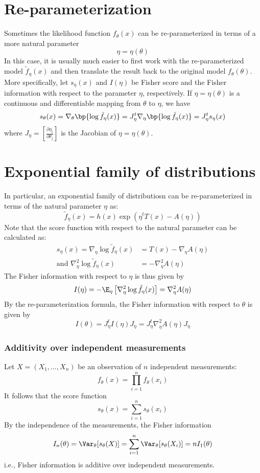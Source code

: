 \section{Re-parameterization}
Sometimes the likelihood function $f_\theta(x)$ can be re-parameterized in terms of a more natural parameter
\[
    \eta = \eta(\theta)
\]
In this case, it is usually much easier to first work with the re-parameterized model $\tilde{f}_\eta (x)$ and then translate the result back to the original model $f_\theta(\theta)$. \\

\noindent More specifically, let $s_\eta (x)$ and $I(\eta)$ be Fisher score and the Fisher information with respect to the parameter $\eta$, respectively. If $\eta = \eta(\theta)$ is a continuous and differentiable mapping from
$\theta$ to $\eta$, we have
\[
    s_\theta(x) = \nabla_\theta \bp{\log \tilde{f}_\eta(x)} = J_\eta^t \nabla_\eta \bp{\log \tilde{f}_\eta (x)} = J_\eta^t s_\eta(x)
\]
where $J_\eta = \left[ \frac{\partial \eta_i}{\partial \theta_j}\right]$ is the Jacobian of $\eta = \eta(\theta)$.

\section{Exponential family of distributions}
In particular, an exponential family of distributiosn can be re-parameterized in terms of the natural parameter $\eta$ as:
\[
    \tilde{f}_\eta(x) = h(x) \exp (\eta^t T(x) - A(\eta))
\]
Note that the score function with respect to the natural parameter can be calculated as:
\begin{align*}
    s_\eta(x) = \nabla_\eta \log \tilde{f}_\eta(x)    & = T(x) - \nabla_\eta A(\eta) \\
    \text{and  } \nabla_\eta^2 \log \tilde{f}_\eta(x) & = -\nabla_\eta^2 A(\eta)
\end{align*}
The Fisher information with respect to $\eta$ is thus given by
\[
    I(\eta) = -\E_\eta \left[ \nabla_\eta^2 \log \tilde{f}_\eta (x)\right] = \nabla_\eta^2 A(\eta)
\]
By the re-parameterization formula, the Fisher information with respect to $\theta$ is given by
\[
    I(\theta) = J_\eta^t I(\eta) J_\eta = J_\eta^t \nabla_\eta^2 A(\eta) J_\eta
\]
\subsubsection{Additivity over independent measurements}
Let $X = (X_1, \dots, X_n)$ be an observation of $n$ independent measurements:
\[
    f_\theta(x) = \prod_{i=1}^n f_\theta(x_i)
\]
It follows that the score function
\[
    s_\theta(x) = \sum_{i=1}^{n} s_\theta (x_i)
\]
By the independence of the measurements, the Fisher information
\[
    I_n(\theta) = \Var_\theta[s_\theta(X)] = \sum_{i=1}^n \Var_\theta[s_\theta(X_i)] = n I_1(\theta)
\]
i.e., Fisher information is additive over independent measurements.
